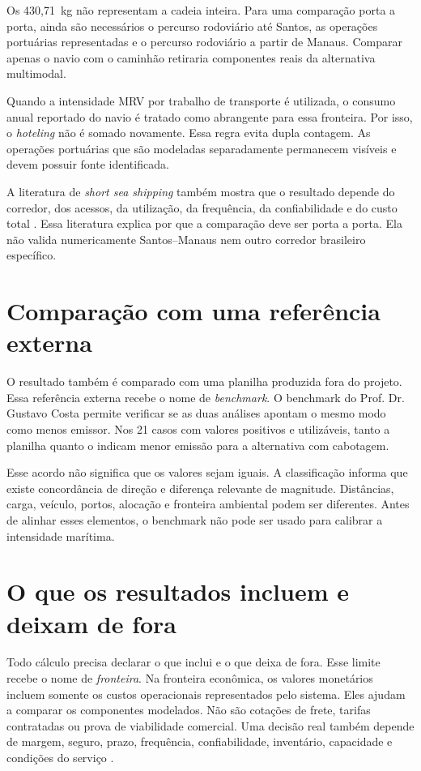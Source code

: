 Os 430,71~kg não representam a cadeia inteira. Para uma comparação porta a porta, ainda são necessários o percurso rodoviário até Santos, as operações portuárias representadas e o percurso rodoviário a partir de Manaus. Comparar apenas o navio com o caminhão retiraria componentes reais da alternativa multimodal.

Quando a intensidade MRV por trabalho de transporte é utilizada, o consumo anual reportado do navio é tratado como abrangente para essa fronteira. Por isso, o \emph{hoteling} não é somado novamente. Essa regra evita dupla contagem. As operações portuárias que são modeladas separadamente permanecem visíveis e devem possuir fonte identificada.

A literatura de \emph{short sea shipping} também mostra que o resultado depende do corredor, dos acessos, da utilização, da frequência, da confiabilidade e do custo total \cite{shortsea2019,modalshiftreview2020}. Essa literatura explica por que a comparação deve ser porta a porta. Ela não valida numericamente Santos--Manaus nem outro corredor brasileiro específico.

\section{Comparação com uma referência externa}
\label{sec:benchmark-discussao}

O resultado também é comparado com uma planilha produzida fora do projeto. Essa referência externa recebe o nome de \emph{benchmark}. O benchmark do Prof. Dr. Gustavo Costa permite verificar se as duas análises apontam o mesmo modo como menos emissor. Nos 21 casos com valores positivos e utilizáveis, tanto a planilha quanto o \CabotageLens{} indicam menor emissão para a alternativa com cabotagem.

Esse acordo não significa que os valores sejam iguais. A classificação  informa que existe concordância de direção e diferença relevante de magnitude. Distâncias, carga, veículo, portos, alocação e fronteira ambiental podem ser diferentes. Antes de alinhar esses elementos, o benchmark não pode ser usado para calibrar a intensidade marítima.

\section{O que os resultados incluem e deixam de fora}
\label{sec:fronteiras-discussao}

Todo cálculo precisa declarar o que inclui e o que deixa de fora. Esse limite recebe o nome de \emph{fronteira}. Na fronteira econômica, os valores monetários incluem somente os custos operacionais representados pelo sistema. Eles ajudam a comparar os componentes modelados. Não são cotações de frete, tarifas contratadas ou prova de viabilidade comercial. Uma decisão real também depende de margem, seguro, prazo, frequência, confiabilidade, inventário, capacidade e condições do serviço \cite{competitiveness2024}.

